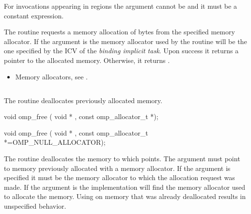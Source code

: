 \constraints

For  invocations appearing in  regions the  argument cannot be  and it must be a constant expression.

\effect

The  routine requests a memory allocation of  bytes from the specified memory allocator. If the  argument is 
 the memory allocator used by the routine will be the one specified by the  ICV of the \emph{binding implicit task}.
Upon success it returns a pointer to the allocated memory. Otherwise, it returns .

\crossreferences
\begin{itemize}
\item Memory allocators, see .
\end{itemize}

\subsection{}
\label{subsec:omp_free}

\summary
The  routine deallocates previously allocated memory. 

\format

\begin{cspecific}
\begin{boxedcode}
void omp_free ( void * , const omp\_allocator\_t *);
\end{boxedcode}
\end{cspecific}
\begin{cppspecific}
\begin{boxedcode}
void omp_free ( void * , 
             const omp\_allocator\_t *=OMP_NULL_ALLOCATOR);
\end{boxedcode}
\end{cppspecific}

\effect

The  routine deallocates the memory to which  points. The  argument must point to memory previously allocated with a memory allocator. If the  argument is specified it must be the memory allocator to which the allocation request was made. If the  argument is  the implementation will find the memory allocator used to allocate the memory. Using  on memory that was already deallocated results in unspecified behavior.

\ccppspecificend
